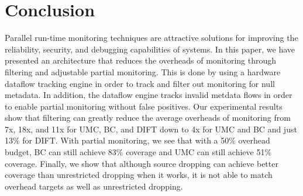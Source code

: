 \section{Conclusion}
\label{sec:conclusion}

Parallel run-time monitoring techniques are attractive solutions for improving
the reliability, security, and debugging capabilities of systems. In this
paper, we have presented an architecture that reduces the overheads of
monitoring through filtering and adjustable partial monitoring. This is done by
using a hardware dataflow tracking engine in order to track and filter out
monitoring for null metadata. In addition, the dataflow engine tracks invalid
metdata flows in order to enable partial monitoring without false positives.
Our experimental results show that filtering can greatly reduce the average
overheads of monitoring from 7x, 18x, and 11x for UMC, BC, and DIFT down to 4x
for UMC and BC and just 13\% for DIFT. With partial monitoring, we see that
with a 50\% overhead budget, BC can still achieve 83\% coverage and UMC can
still achieve 51\% coverage. Finally, we show that although source dropping can
achieve better coverage than unrestricted dropping when it works, it is not
able to match overhead targets as well as unrestricted dropping.
